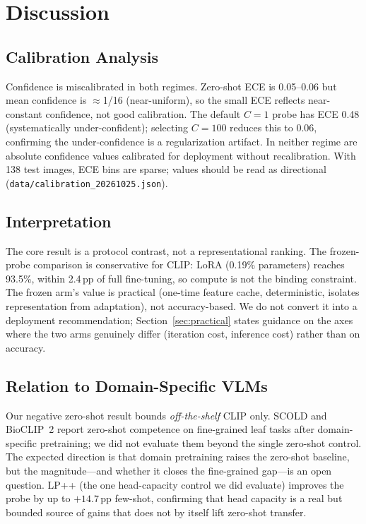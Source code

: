 \documentclass[10pt,a4paper]{article}
\begin{document}
\section{Discussion}
\label{sec:discussion}

\subsection{Calibration Analysis}

Confidence is miscalibrated in both regimes. Zero-shot ECE is 0.05--0.06 but mean confidence is $\approx$1/16 (near-uniform), so the small ECE reflects near-constant confidence, not good calibration. The default $C{=}1$ probe has ECE 0.48 (systematically under-confident); selecting $C{=}100$ reduces this to 0.06, confirming the under-confidence is a regularization artifact. In neither regime are absolute confidence values calibrated for deployment without recalibration. With 138 test images, ECE bins are sparse; values should be read as directional (\texttt{data/calibration\_20261025.json}).

\subsection{Interpretation}

The core result is a protocol contrast, not a representational ranking. The frozen-probe comparison is conservative for CLIP: LoRA (0.19\% parameters) reaches 93.5\%, within 2.4\,pp of full fine-tuning, so compute is not the binding constraint. The frozen arm's value is practical (one-time feature cache, deterministic, isolates representation from adaptation), not accuracy-based. We do not convert it into a deployment recommendation; Section~\ref{sec:practical} states guidance on the axes where the two arms genuinely differ (iteration cost, inference cost) rather than on accuracy.

\subsection{Relation to Domain-Specific VLMs}

Our negative zero-shot result bounds \emph{off-the-shelf} CLIP only. SCOLD and BioCLIP~2 report zero-shot competence on fine-grained leaf tasks after domain-specific pretraining; we did not evaluate them beyond the single zero-shot control. The expected direction is that domain pretraining raises the zero-shot baseline, but the magnitude---and whether it closes the fine-grained gap---is an open question. LP++ (the one head-capacity control we did evaluate) improves the probe by up to $+14.7$\,pp few-shot, confirming that head capacity is a real but bounded source of gains that does not by itself lift zero-shot transfer.
\end{document}
